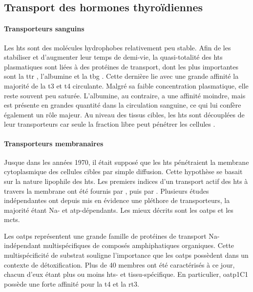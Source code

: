 \subsection{Transport des hormones thyroïdiennes}\label{subsec:ht-transport}

\paragraph{Transporteurs sanguins}
Les \glspl{ht} sont des molécules hydrophobes relativement peu stable.
Afin de les stabiliser et d'augmenter leur temps de demi-vie, la quasi-totalité des \glspl{ht} plasmatiques sont liées à des protéines de transport, dont les plus importantes sont la \gls{ttr} \citep{Palha2002}, l'albumine et la \gls{tbg} \citep{Schussler2000}.
Cette dernière lie avec une grande affinité la majorité de la \gls{t3} et \gls{t4} circulante.
Malgré sa faible concentration plasmatique, elle reste souvent peu saturée.
L'albumine, au contraire, a une affinité moindre, mais est présente en grandes quantité dans la circulation sanguine, ce qui lui confère également un rôle majeur.
Au niveau des tissus cibles, les \glspl{ht} sont découplées de leur transporteurs car seule la fraction libre peut pénétrer les cellules \citep{Ekins1994}.

\paragraph{Transporteurs membranaires}
Jusque dans les années 1970, il était supposé que les \glspl{ht} pénétraient la membrane cytoplasmique des cellules cibles par simple diffusion. Cette hypothèse se basait sur la nature lipophile des \glspl{ht}.
Les premiers indices d'un transport actif des \glspl{ht} à travers la membrane ont été fournis par \citet{Christensen1954}, puis par \citet{Rao1976}. Plusieurs études indépendantes ont depuis mis en évidence une pléthore de transporteurs, la majorité étant \gls{Na}- et \gls{atp}-dépendants. Les mieux décrits sont les \glspl{oatp} et les \glspl{mct}.

Les \glspl{oatp} représentent une grande famille de protéines de transport \gls{Na}-indépendant multispécifiques de composés amphiphatiques organiques.
Cette multispécificité de substrat souligne l'importance que les \glspl{oatp} possèdent dans un contexte de détoxification.
Plus de 40 membres ont été caractérisés à ce jour, chacun d'eux étant plus ou moins \glspl{ht}- et tissu-spécifique.
En particulier, \gls{oatp}1C1 possède une forte affinité pour la \gls{t4} et la \gls{rt3}.

